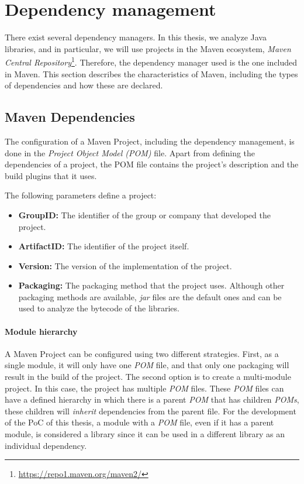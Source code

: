 \section{Dependency management}
There exist several dependency managers. In this thesis, we analyze Java libraries, and in particular, we will use projects in the Maven ecosystem, \textit{Maven Central Repository}\footnote{\url{https://repo1.maven.org/maven2/}}. Therefore, the dependency manager used is the one included in Maven. This section describes the characteristics of Maven, including the types of dependencies and how these are declared.

\subsection{Maven Dependencies}
The configuration of a Maven Project, including the dependency management, is done in the \textit{Project Object Model (POM)} file. Apart from defining the dependencies of a project, the POM file contains the project's description and the build plugins that it uses.

The following parameters define a project:

\begin{itemize}
  \item \textbf{GroupID:} The identifier of the group or company that developed the project.
  \item \textbf{ArtifactID:} The identifier of the project itself.
  \item \textbf{Version:} The version of the implementation of the project.
  \item \textbf{Packaging:} The packaging method that the project uses. Although other packaging methods are available, \textit{jar} files are the default ones and can be used to analyze the bytecode of the libraries.
\end{itemize}

\paragraph{Module hierarchy}
A Maven Project can be configured using two different strategies. First, as a single module, it will only have one \textit{POM} file, and that only one packaging will result in the build of the project. The second option is to create a multi-module project. In this case, the project has multiple \textit{POM} files. These \textit{POM} files can have a defined hierarchy in which there is a parent \textit{POM} that has children \textit{POMs}, these children will \textit{inherit} dependencies from the parent file. For the development of the PoC of this thesis, a module with a \textit{POM} file, even if it has a parent module, is considered a library since it can be used in a different library as an individual dependency.

